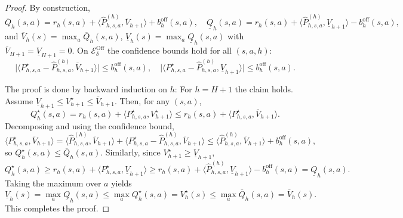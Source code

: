 \documentclass[twoside]{article}
\begin{document}
\begin{proof}
By construction,
\[
\overline Q_h(s,a)=r_h(s,a)+\langle \widehat{P}^{(h)}_{h,s,a},\overline V_{h+1}\rangle+b_h^{\mathrm{off}}(s,a),
\quad
\underline Q_h(s,a)=r_h(s,a)+\langle \widehat{P}^{(h)}_{h,s,a},\underline V_{h+1}\rangle-b_h^{\mathrm{off}}(s,a),
\]
and $\overline V_h(s)=\max_{a}\overline Q_h(s,a)$, $\underline V_h(s)=\max_{a}\underline Q_h(s,a)$ with $\overline V_{H+1}=\underline V_{H+1}=0$.  
On $\mathcal E^{\mathrm{Off}}_{\delta}$ the confidence bounds hold for all $(s,a,h)$:
\[
\big|\langle P^{\star}_{h,s,a}-\widehat{P}^{(h)}_{h,s,a},\overline V_{h+1}\rangle\big|\le b_h^{\mathrm{off}}(s,a),
\quad
\big|\langle P^{\star}_{h,s,a}-\widehat{P}^{(h)}_{h,s,a},\underline V_{h+1}\rangle\big|\le b_h^{\mathrm{off}}(s,a).
\]

The proof is done by backward induction on $h$: For $h=H+1$ the claim holds. Assume $\underline V_{h+1}\le V_{h+1}^\star\le \overline V_{h+1}$. Then, for any $(s,a)$,
\[
Q_h^\star(s,a)=r_h(s,a)+\langle P^{\star}_{h,s,a},V_{h+1}^\star\rangle
\le r_h(s,a)+\langle P^{\star}_{h,s,a},\overline V_{h+1}\rangle.
\]
Decomposing and using the confidence bound,
\[
\langle P^{\star}_{h,s,a},\overline V_{h+1}\rangle
=\langle \widehat{P}^{(h)}_{h,s,a},\overline V_{h+1}\rangle+\langle P^{\star}_{h,s,a}-\widehat{P}^{(h)}_{h,s,a},\overline V_{h+1}\rangle
\le \langle \widehat{P}^{(h)}_{h,s,a},\overline V_{h+1}\rangle+b_h^{\mathrm{off}}(s,a),
\]
so $Q_h^\star(s,a)\le \overline Q_h(s,a)$. Similarly, since $V_{h+1}^\star\ge \underline V_{h+1}$,
\[
Q_h^\star(s,a)\ge r_h(s,a)+\langle P^{\star}_{h,s,a},\underline V_{h+1}\rangle
\ge r_h(s,a)+\langle \widehat{P}^{(h)}_{h,s,a},\underline V_{h+1}\rangle-b_h^{\mathrm{off}}(s,a)
=\underline Q_h(s,a).
\]
Taking the maximum over $a$ yields
\[
\underline V_h(s)=\max_{a}\underline Q_h(s,a)\le \max_{a}Q_h^\star(s,a)=V_h^\star(s)
\le \max_{a}\overline Q_h(s,a)=\overline V_h(s).
\]
This completes the proof.
\end{proof}
\end{document}
